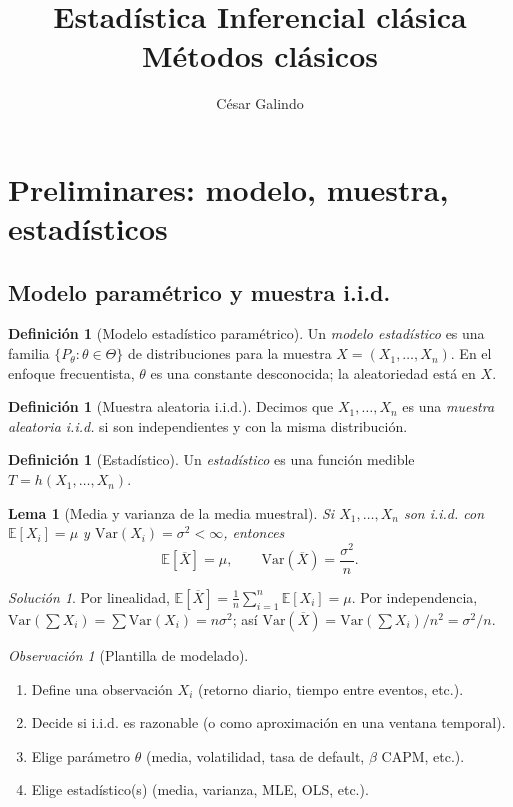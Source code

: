 \documentclass[11pt]{article}
\title{\vspace{-1.2em}\textbf{Estadística Inferencial clásica}\\
\large Métodos clásicos}
\author{César Galindo}
\date{\vspace{-0.4em}}
\theoremstyle{plain}
\newtheorem{lemma}[theorem]{Lema}
\theoremstyle{definition}
\newtheorem{definition}[theorem]{Definición}
\theoremstyle{remark}
\newtheorem{remark}[theorem]{Observación}
\theoremstyle{solstyle}
\newtheorem*{solution}{Solución}
\newcommand{\E}{\mathbb{E}}
\newcommand{\Var}{\mathrm{Var}}
\newcommand{\1}{\mathbbm{1}}
\newcommand{\Xbar}{\overline{X}}
\begin{document}
\maketitle
\vspace{-0.5em}
\tableofcontents

\section{Preliminares: modelo, muestra, estadísticos}

\subsection{Modelo paramétrico y muestra i.i.d.}

\begin{definition}[Modelo estadístico paramétrico]
Un \emph{modelo estadístico} es una familia $\{P_\theta:\theta\in\Theta\}$ de distribuciones para la muestra
$X=(X_1,\dots,X_n)$. En el enfoque frecuentista, $\theta$ es una constante desconocida; la aleatoriedad está en $X$.
\end{definition}

\begin{definition}[Muestra aleatoria i.i.d.]
Decimos que $X_1,\dots,X_n$ es una \emph{muestra aleatoria i.i.d.} si son independientes y con la misma distribución.
\end{definition}

\begin{definition}[Estadístico]
Un \emph{estadístico} es una función medible $T=h(X_1,\dots,X_n)$.
\end{definition}

\begin{lemma}[Media y varianza de la media muestral]\label{lem:meanvarXbar}
Si $X_1,\dots,X_n$ son i.i.d. con $\E[X_i]=\mu$ y $\Var(X_i)=\sigma^2<\infty$, entonces
\[
\E[\Xbar]=\mu,\qquad \Var(\Xbar)=\frac{\sigma^2}{n}.
\]
\end{lemma}

\begin{solution}
Por linealidad, $\E[\Xbar]=\frac1n\sum_{i=1}^n \E[X_i]=\mu$.
Por independencia, $\Var(\sum X_i)=\sum \Var(X_i)=n\sigma^2$; así
$\Var(\Xbar)=\Var(\sum X_i)/n^2=\sigma^2/n$.
\end{solution}

\begin{remark}[Plantilla de modelado]
\begin{enumerate}[label=\textbf{(\arabic*)},leftmargin=2.2em]
\item Define una observación $X_i$ (retorno diario, tiempo entre eventos, etc.).
\item Decide si i.i.d. es razonable (o como aproximación en una ventana temporal).
\item Elige parámetro $\theta$ (media, volatilidad, tasa de default, $\beta$ CAPM, etc.).
\item Elige estadístico(s) (media, varianza, MLE, OLS, etc.).
\end{enumerate}
\end{remark}
\end{document}
